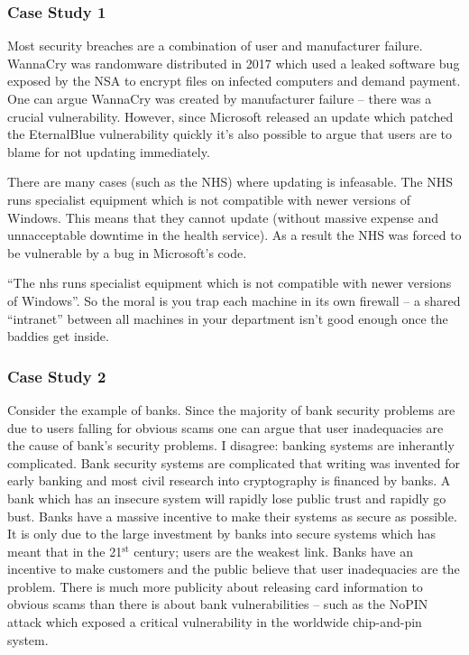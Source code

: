 \documentclass[10pt,\jkfside,a4paper]{article}
\begin{document}
\begin{enumerate}
\subsubsection*{Case Study 1}

Most security breaches are a combination of user and manufacturer failure. WannaCry was randomware 
distributed in 2017 which used a leaked software bug exposed by the NSA to encrypt files on infected 
computers and demand payment. One can argue WannaCry was created by manufacturer failure -- there was 
a crucial vulnerability. However, since Microsoft released an update which patched the EternalBlue 
vulnerability quickly it's also possible to argue that users are to blame for not updating immediately.

There are many cases (such as the NHS) where updating is infeasable. The NHS runs specialist 
equipment which is not compatible with newer versions of Windows. This means that they cannot 
update (without massive expense and unnacceptable downtime in the health service). As a result 
the NHS was forced to be vulnerable by a bug in Microsoft's code.

{\color{blue} ``The nhs runs specialist equipment which is not compatible with newer versions of Windows''. So the
moral is you trap each machine in its own firewall -- a shared ``intranet'' between all machines in your department
isn't good enough once the baddies get inside.}

\subsubsection*{Case Study 2}

Consider the example of banks. Since the majority of bank security problems 
are due to users falling for obvious scams one can argue that user inadequacies are the cause 
of bank's security problems. I disagree: banking systems are inherantly complicated. Bank 
security systems are  complicated that writing 
was invented for early banking and most civil research into cryptography is financed by banks. 
A bank which has an insecure system will rapidly lose public 
trust and rapidly go bust. Banks have a massive incentive to make their systems as secure as possible. 
It is only due to the large investment by banks into secure systems which has meant that in 
the 21$^{\text{st}}$ century; users are the weakest link. Banks have an incentive to make 
customers and the public believe that user inadequacies are the problem. There is much more 
publicity about releasing card information to obvious scams than there is about bank vulnerabilities 
-- such as the NoPIN attack which exposed a critical vulnerability in the worldwide chip-and-pin 
system.


\end{enumerate}
\end{document}
